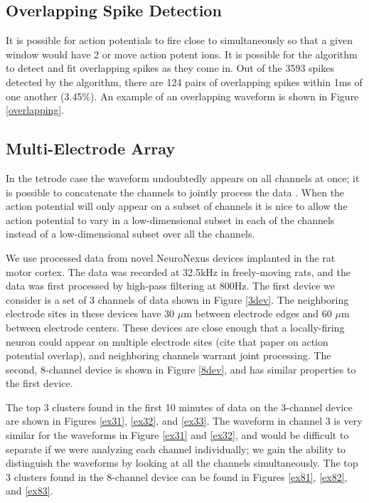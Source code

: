 \subsection{Overlapping Spike Detection}
It is possible for action potentials to fire close to simultaneously so that a given window would have 2 or move action potent ions.  It is possible for the algorithm to detect and fit overlapping spikes as they come in.  Out of the 3593 spikes detected by the algorithm, there are 124 pairs of overlapping spikes within 1ms of one another (3.45\%).  An example of an overlapping waveform is shown in Figure \ref{overlapping}.

\subsection{Multi-Electrode Array} \label{sub:multi}

In the tetrode case the waveform undoubtedly appears on all channels at once; it is possible to concatenate the channels to jointly process the data \cite{wood2009}.  When the action potential will only appear on a subset of channels it is nice to allow the action potential to vary in a low-dimensional subset in each of the channels instead of a low-dimensional subset over all the channels. \cite{Prentice2011}

We use processed data from novel NeuroNexus devices implanted in the rat motor cortex.  The data was recorded at 32.5kHz in freely-moving rats, and the data was first processed by high-pass filtering at 800Hz.  The first device we consider is a set of 3 channels of data shown in Figure \ref{3dev}.  The neighboring electrode sites in these devices have 30 $\mu$m between electrode edges and 60 $\mu$m between electrode centers.  These devices are close enough that a locally-firing neuron could appear on multiple electrode sites (cite that paper on action potential overlap), and neighboring channels warrant joint processing.  The second, 8-channel device is shown in Figure \ref{8dev}, and has similar properties to the first device.

 The top 3 clusters found in the first 10 minutes of data on the 3-channel device are shown in Figures \ref{ex31}, \ref{ex32}, and \ref{ex33}.  The waveform in channel 3 is very similar for the waveforms in Figure \ref{ex31} and \ref{ex32}, and would be difficult to separate if we were analyzing each channel individually; we gain the ability to distinguish the waveforms by looking at all the channels simultaneously.  The top 3 clusters found in the 8-channel device can be found in Figures \ref{ex81}, \ref{ex82}, and \ref{ex83}.

